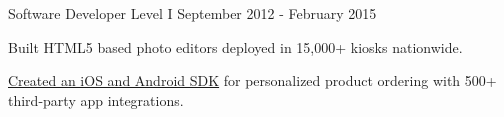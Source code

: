 \begin{cventries}
  \cventry
    {Software Developer Level I} %
    { } %
    { } %
    {September 2012 - February 2015} %
    {
      \begin{cvitems} %
      \item{Built HTML5 based photo editors deployed in 15,000+ kiosks nationwide.}
    \item{\href{https://www.fujifilmapi.com/api.html}{Created an iOS and Android SDK} for personalized product ordering with 500+ third-party app integrations.}
      \end{cvitems}
    }



\end{cventries}

